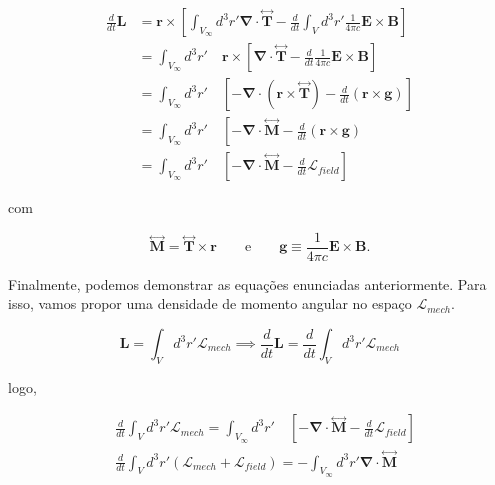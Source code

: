 \begin{equation}
	\begin{split}
		\frac{d}{dt}\mathbf{L} & = \textbf{r} \times \left[ \int_{V_{\infty}} d^3r' \mathbf{\nabla} \cdot \overset{\leftrightarrow}{\textbf{T}} - \frac{d}{dt}\int_V d^3r'\frac{1}{4\pi c} \textbf{E} \times \textbf{B}\right] \\
		& = \int_{V_{\infty}} d^3r' \quad \textbf{r} \times \left[ \mathbf{\nabla} \cdot \overset{\leftrightarrow}{\textbf{T}} - \frac{d}{dt}\frac{1}{4\pi c} \textbf{E} \times \textbf{B}\right] \\
		& = \int_{V_{\infty}} d^3r'  \quad \left[-\mathbf{\nabla} \cdot \left( \mathbf{r} \times\overset{\leftrightarrow}{\textbf{T}} \right)-\frac{d}{dt} \left( \mathbf{r} \times \mathbf{g} \right) \right] \\
		& = \int_{V_{\infty}} d^3r'  \quad \left[ -\mathbf{\nabla} \cdot \overset{\leftrightarrow}{\textbf{M}} - \frac{d}{dt} \left( \mathbf{r} \times \mathbf{g} \right) \\
		& = \int_{V_{\infty}} d^3r'  \quad \left[ -\mathbf{\nabla} \cdot \overset{\leftrightarrow}{\textbf{M}} - \frac{d}{dt} \mathcal{L}_{field} \right]
	\end{split}
\end{equation}

com 

\begin{equation*}
	\overset{\leftrightarrow}{\textbf{M}} =  \overset{\leftrightarrow}{\textbf{T}} \times \mathbf{r} \qquad \text{e} \qquad \mathbf{g} \equiv \frac{1}{4\pi c} \textbf{E} \times \textbf{B}.
\end{equation*}

Finalmente, podemos demonstrar as equações enunciadas anteriormente. Para isso, vamos propor uma densidade de momento angular no espaço $\mathcal{L}_{mech}$.

\begin{equation}
	\textbf{L} = \int_V d^3r' \mathcal{L}_{mech} \implies \frac{d}{dt}\mathbf{L} = \frac{d}{dt} \int_V d^3r' \mathcal{L}_{mech} 
\end{equation}

logo,

\begin{equation}
	\begin{split}
		& \frac{d}{dt} \int_V d^3r' \mathcal{L}_{mech} = \int_{V_{\infty}} d^3r'  \quad \left[ -\mathbf{\nabla} \cdot \overset{\leftrightarrow}{\textbf{M}} - \frac{d}{dt} \mathcal{L}_{field} \right] \\
		& \frac{d}{dt} \int_V d^3r' \left(\mathcal{L}_{mech} + \mathcal{L}_{field} \right) =- \int_{V_{\infty}} d^3r' \mathbf{\nabla} \cdot \overset{\leftrightarrow}{\textbf{M}} \\
	\end{split}
\end{equation}

